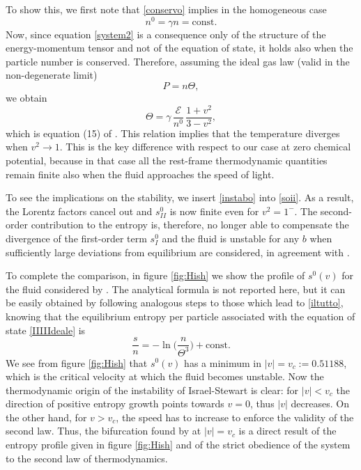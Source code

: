 \documentclass[a4paper, amsfonts, amssymb, amsmath, reprint, showkeys, nofootinbib, twoside]{revtex4-1}
\begin{document}
To show this, we first note that \eqref{conservo} implies in the homogeneous case
\begin{equation}
n^0 = \gamma  n = \text{const}.
\end{equation}
Now, since equation \eqref{system2} is a consequence only of the structure of the energy-momentum tensor and not of the equation of state, it holds also when the particle number is conserved. Therefore, assuming the ideal gas law (valid in the non-degenerate limit)
\begin{equation}\label{IIIIIdeale}
P = n\Theta,
\end{equation} 
we obtain
\begin{equation}\label{instabo}
\Theta =\gamma \, \dfrac{\mathcal{E} }{n^0} \, \dfrac{1+v^2}{3-v^2},
\end{equation}
which is equation (15) of \cite{Hishcock1988}. This relation implies that the temperature diverges when $v^2 \longrightarrow 1$. This is the key difference with respect to our case at zero chemical potential, because in that case all the rest-frame thermodynamic quantities remain finite also when the fluid approaches the speed of light. 

To see the implications on the stability, we insert \eqref{instabo} into \eqref{soii}. As a result, the Lorentz factors cancel out and $s_{II}^0$ is now finite even for $v^2 = 1^-$. The second-order contribution to the entropy is, therefore, no longer able to compensate the divergence of the first-order term $s_I^0$ and the fluid is unstable for any $b$ when sufficiently large deviations from equilibrium are considered, in agreement with \cite{Hishcock1988}. 

To complete the comparison, in figure \ref{fig:Hish} we show the profile of $s^0(v)$ for the fluid considered by \cite{Hishcock1988}. The analytical formula is not reported here, but it can be easily obtained by following analogous steps to those which lead to \eqref{iltutto}, knowing that the equilibrium entropy per particle associated with the equation of state \eqref{IIIIIdeale} is 
\begin{equation}
\dfrac{s}{n} = - \ln \bigg( \dfrac{n}{\Theta^3} \bigg) + \text{const}.
\end{equation}
We see from figure \ref{fig:Hish} that $s^0(v)$ has a minimum in $|v|=v_c:=0.51188$, which is the critical velocity at which the fluid becomes unstable. Now the thermodynamic origin of the instability of Israel-Stewart is clear: for $|v|<v_c$ the direction of positive entropy growth points towards $v=0$, thus $|v|$ decreases. On the other hand, for $v>v_c$, the speed has to increase to enforce the validity of the second law. Thus, the bifurcation found by \cite{Hishcock1988} at $|v|=v_c$ is a direct result of the entropy profile given in figure \ref{fig:Hish} and of the strict obedience of the system to the second law of thermodynamics. 
\end{document}

